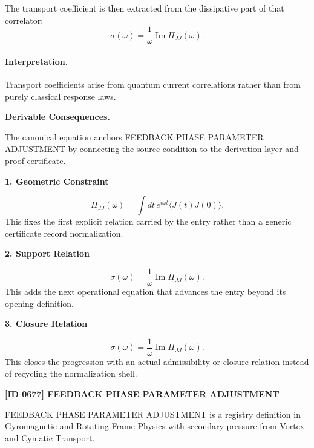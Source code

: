 The transport coefficient is then extracted from the dissipative part of that correlator:
\begin{equation}
\boxed{
\sigma(\omega)
=
\frac{1}{\omega}
\operatorname{Im}\Pi_{JJ}(\omega).
}
\end{equation}

\paragraph{Interpretation.}
Transport coefficients arise from quantum current correlations rather than from purely classical response laws.

\par\vspace{0.35em}
\noindent\textbf{Derivable Consequences.}\quad
\begingroup
\footnotesize
\raggedright
The canonical equation anchors FEEDBACK PHASE PARAMETER ADJUSTMENT by connecting the source condition to the derivation layer and proof certificate.
\par\endgroup

\noindent\textbf{1. Geometric Constraint}\par
\[
\Pi_{JJ}(\omega) = \int dt\, e^{i\omega t} \langle J(t)J(0)\rangle.
\]
\noindent This fixes the first explicit relation carried by the entry rather than a generic certificate record normalization.\par
\noindent\textbf{2. Support Relation}\par
\[
\sigma(\omega) = \frac{1}{\omega} \operatorname{Im}\Pi_{JJ}(\omega).
\]
\noindent This adds the next operational equation that advances the entry beyond its opening definition.\par
\noindent\textbf{3. Closure Relation}\par
\[
\boxed{ \sigma(\omega) = \frac{1}{\omega} \operatorname{Im}\Pi_{JJ}(\omega). }
\]
\noindent This closes the progression with an actual admissibility or closure relation instead of recycling the normalization shell.\par

\clearpage
\noindent\textbf{[ID 0677] FEEDBACK PHASE PARAMETER ADJUSTMENT}\par
\vspace{0.35em}
\begingroup\small
{}
FEEDBACK PHASE PARAMETER ADJUSTMENT is a registry definition in Gyromagnetic and Rotating-Frame Physics with secondary pressure from Vortex and Cymatic Transport.

